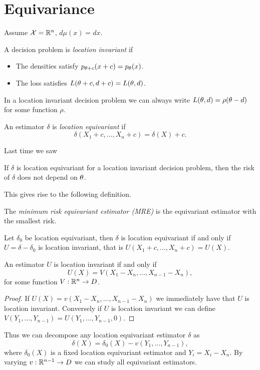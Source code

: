 \section{Equivariance}
Assume ${\mathcal{X}} = {\mathbb R}^n$, $d\mu(x) = dx$.
\begin{defn}
    A decision problem is \emph{location invariant} if 
    \begin{itemize}
        \item The densities satisfy $p_{{\theta}+c}(x+c)=p_{\theta}(x)$.
        \item The loss satisfies $L({\theta}+c,d+c) = L({\theta},d)$.
    \end{itemize}
\end{defn}
In a location invariant decision problem we can always write $L({\theta},d) = \rho({\theta} -d)$ for some function $\rho$.
\begin{defn}
    An estimator $\delta$ is \emph{location equivariant} if 
    \[\delta(X_1+c,\ldots, X_n + c) = \delta(X)+c. \]
\end{defn}
Last time we saw
\begin{thrm}
    If $\delta$ is location equivariant for a location invariant decision problem, then the risk of $\delta$ does not depend on ${\theta}$.
\end{thrm}
This gives rise to the following definition.
\begin{defn}
    The \emph{minimum risk equivariant estimator (MRE)} is the equivariant estimator with the smallest risk.
\end{defn}
\begin{lemma}
    Let $\delta_0$ be location equivariant, then $\delta$ is location equivariant if and only if $U=\delta-\delta_0$ is location invariant, that is $U(X_1+c,\ldots, X_n+c)=U(X)$.
\end{lemma}
\begin{lemma}
    An estimator $U$ is location invariant if and only if
    \[U(X)=V(X_1-X_n,\ldots, X_{n-1}-X_n), \]
    for some function $V : {\mathbb R}^n \to D$.
\end{lemma}
\begin{proof}
    If $U(X) = v(X_1-X_n,\ldots, X_{n-1}-X_n)$ we immediately have that $U$ is location invariant. Conversely if $U$ is location invariant we can define $V(Y_1,\ldots, Y_{n-1})=U(Y_1,\ldots, Y_{n-1},0)$. 
\end{proof}
Thus we can decompose any location equivariant estimator $\delta$ as 
\[\delta(X) = \delta_0(X)-v(Y_1,\ldots, Y_{n-1}),  \]
where $\delta_0(X)$ is a fixed location equivariant estimator and $Y_i = X_i-X_n$. By varying $v : {\mathbb R}^{n-1} \to D$ we can study all equivariant estimators.
